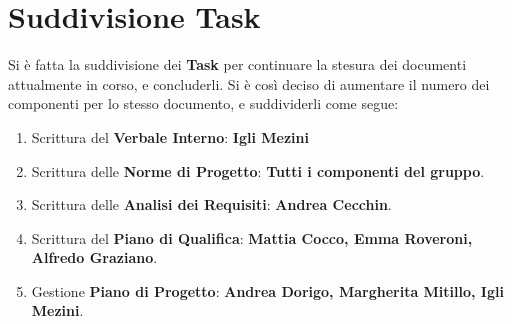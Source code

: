 	\section{Suddivisione Task}
Si è fatta la suddivisione dei \textbf{Task} per continuare la stesura dei documenti attualmente in corso, e concluderli.
	Si è così deciso di aumentare il numero dei componenti per lo stesso documento, e suddividerli come segue:
	\begin{enumerate}
		\item Scrittura del \textbf{Verbale Interno}: \textbf{Igli Mezini}
		\item Scrittura delle \textbf{Norme di Progetto}: \textbf{Tutti i componenti del gruppo}.
		\item Scrittura delle \textbf{Analisi dei Requisiti}: \textbf{Andrea Cecchin}.
		\item Scrittura del \textbf{Piano di Qualifica}: \textbf{Mattia Cocco, Emma Roveroni, Alfredo Graziano}.
		\item Gestione \textbf{Piano di Progetto}: \textbf{Andrea Dorigo, Margherita Mitillo, Igli Mezini}.
	\end{enumerate}
